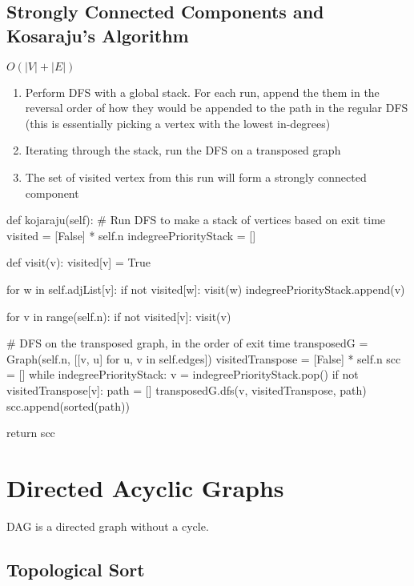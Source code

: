 \subsection{Strongly Connected Components and Kosaraju's Algorithm}

$O(|V| + |E|)$

\begin{enumerate}
  \item Perform DFS with a global stack. For each run, append the them in the reversal order of how they would be appended to the path in the regular DFS (this is essentially picking a vertex with the lowest in-degrees)
  \item Iterating through the stack, run the DFS on a transposed graph
  \item The set of visited vertex from this run will form a strongly connected component
\end{enumerate}

\begin{python}
    def kojaraju(self):
        # Run DFS to make a stack of vertices based on exit time
        visited = [False] * self.n
        indegreePriorityStack = []

        def visit(v):
            visited[v] = True

            for w in self.adjList[v]:
                if not visited[w]:
                    visit(w)
            indegreePriorityStack.append(v)

        for v in range(self.n):
            if not visited[v]:
                visit(v)

        # DFS on the transposed graph, in the order of exit time
        transposedG = Graph(self.n, [[v, u] for u, v in self.edges])
        visitedTranspose = [False] * self.n
        scc = []
        while indegreePriorityStack:
            v = indegreePriorityStack.pop()
            if not visitedTranspose[v]:
                path = []
                transposedG.dfs(v, visitedTranspose, path)
                scc.append(sorted(path))

        return scc
\end{python}

\section{Directed Acyclic Graphs}

DAG is a directed graph without a cycle.

\subsection{Topological Sort}

